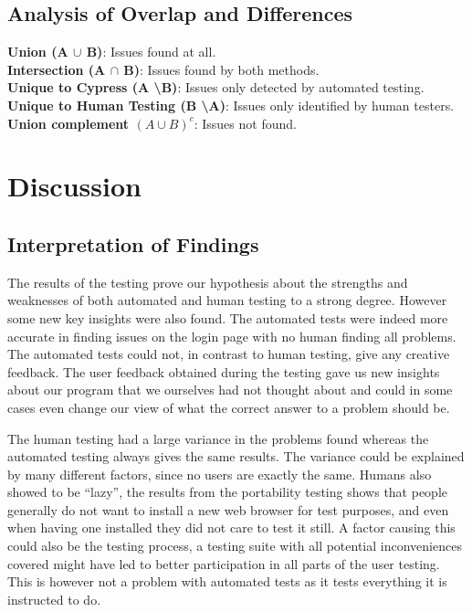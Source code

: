 \documentclass[journal,twocolumn]{IEEEtran}
\begin{document}
\subsection{Analysis of Overlap and Differences}
\textbf{Union (A $\cup$ B)}: Issues found at all. \\
\textbf{Intersection (A $\cap$ B)}: Issues found by both methods. \\
\textbf{Unique to Cypress (A \textbackslash B)}: Issues only detected by automated testing. \\
\textbf{Unique to Human Testing (B \textbackslash A)}: Issues only identified by human testers. \\
\textbf{Union complement $(A \cup B)^c$}: Issues not found.


\section{Discussion}
\subsection{Interpretation of Findings}

The results of the testing prove our hypothesis about the strengths and weaknesses of both automated and human testing to a strong degree. However some new key insights were also found. The automated tests were indeed more accurate in finding issues on the login page with no human finding all problems. The automated tests could not, in contrast to human testing, give any creative feedback. The user feedback obtained during the testing gave us new insights about our program that we ourselves had not thought about and could in some cases even change our view of what the correct answer to a problem should be.

The human testing had a large variance in the problems found whereas the automated testing always gives the same results. The variance could be explained by many different factors, since no users are exactly the same. Humans also showed to be “lazy”, the results from the portability testing shows that people generally do not want to install a new web browser for test purposes, and even when having one installed they did not care to test it still. A factor causing this could also be the testing process, a testing suite with all potential inconveniences covered might have led to better participation in all parts of the user testing. This is however not a problem with automated tests as it tests everything it is instructed to do.
\end{document}
